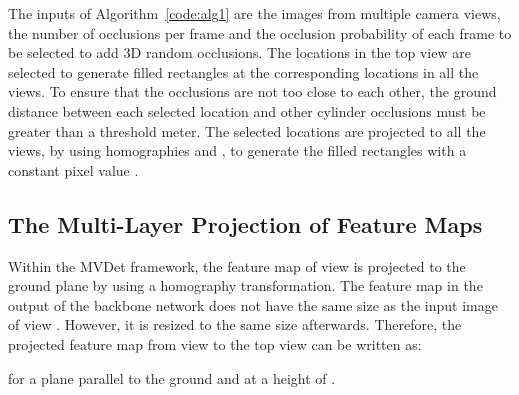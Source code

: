 \documentclass[runningheads]{llncs}
\begin{document}
	The inputs of Algorithm~\ref{code:alg1} are the images  from multiple camera views, the number of occlusions  per frame and the occlusion probability  of each frame to be selected to add 3D random occlusions. The  locations in the top view are selected to generate filled rectangles at the corresponding locations in all the views. To ensure that the occlusions are not too close to each other, the ground distance between each selected location and other cylinder occlusions must be greater than a threshold  meter. The selected locations are projected to all the views, by using homographies  and , to generate the filled rectangles with a constant pixel value .
	
	
	\subsection{The Multi-Layer Projection of Feature Maps}
	Within the MVDet framework, the feature map  of view  is projected to the ground plane by using a homography transformation. The feature map in the output of the backbone network does not have the same size as the input image  of view . However, it is resized to the same size afterwards. Therefore, the projected feature map  from view  to the top view can be written as:
	
	for a plane parallel to the ground and at a height of .
\end{document}
